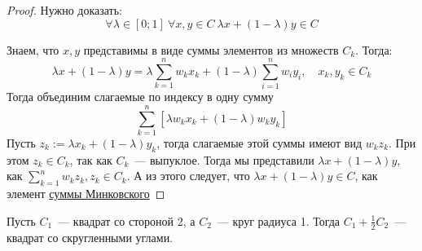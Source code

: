 

\begin{proof}
  Нужно доказать:
  \[
  \forall \lambda \in [0;1]\ \forall x, y \in C\ \lambda x +  (1- \lambda )y \in C
  \]

  Знаем, что $x,y$ представимы в виде суммы элементов из множеств $C_k$.
  Тогда:
  \[
  \lambda x + (1-\lambda)y = \lambda \sum\limits_{k=1}^n w_k x_k + (1-\lambda) \sum\limits_{i=1}^n w_i y_i,\quad x_k,y_k \in C_k
  \]
  Тогда объединим слагаемые по индексу в одну сумму
  \[
  \sum\limits_{k=1}^n \left[ \lambda w_kx_k + (1-\lambda) w_ky_k \right]
  \]
  Пусть $z_k:= \lambda x_k + (1-\lambda)y_k$, тогда слагаемые этой суммы имеют вид $w_kz_k$.
  При этом $z_k \in C_k$, так как $C_k$~--- выпуклое.
  Тогда мы представили $\lambda x + (1-\lambda)y$, как $\sum\limits_{k=1}^n w_kz_k, z_{k} \in C_k$.
  А из этого следует, что $\lambda x + (1-\lambda)y \in C$, как элемент \hyperref[note:14FE7B45-F304-4C15-8086-3535589FA04A]{суммы Минковского}
\end{proof}

\begin{example}
  Пусть $C_1$~--- квадрат со стороной 2, а $C_2$~--- круг радиуса 1. Тогда $C_1 + \frac{1}{2} C_2$~--- квадрат со скругленными углами.
\end{example}
